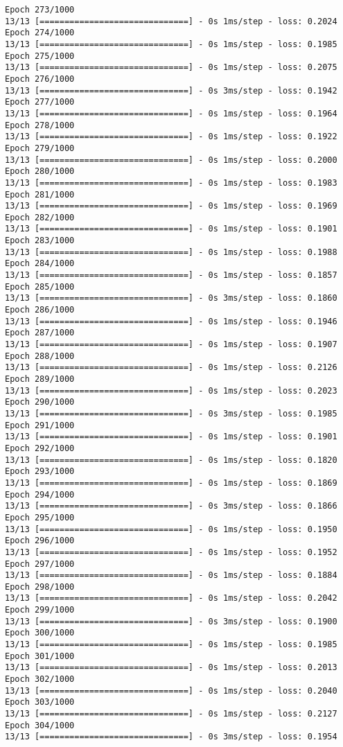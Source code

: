 \documentclass[11pt]{article}
\begin{document}
\begin{Verbatim}[commandchars=\\\{\}]
Epoch 273/1000
13/13 [==============================] - 0s 1ms/step - loss: 0.2024
Epoch 274/1000
13/13 [==============================] - 0s 1ms/step - loss: 0.1985
Epoch 275/1000
13/13 [==============================] - 0s 1ms/step - loss: 0.2075
Epoch 276/1000
13/13 [==============================] - 0s 3ms/step - loss: 0.1942
Epoch 277/1000
13/13 [==============================] - 0s 1ms/step - loss: 0.1964
Epoch 278/1000
13/13 [==============================] - 0s 1ms/step - loss: 0.1922
Epoch 279/1000
13/13 [==============================] - 0s 1ms/step - loss: 0.2000
Epoch 280/1000
13/13 [==============================] - 0s 1ms/step - loss: 0.1983
Epoch 281/1000
13/13 [==============================] - 0s 1ms/step - loss: 0.1969
Epoch 282/1000
13/13 [==============================] - 0s 1ms/step - loss: 0.1901
Epoch 283/1000
13/13 [==============================] - 0s 1ms/step - loss: 0.1988
Epoch 284/1000
13/13 [==============================] - 0s 1ms/step - loss: 0.1857
Epoch 285/1000
13/13 [==============================] - 0s 3ms/step - loss: 0.1860
Epoch 286/1000
13/13 [==============================] - 0s 1ms/step - loss: 0.1946
Epoch 287/1000
13/13 [==============================] - 0s 1ms/step - loss: 0.1907
Epoch 288/1000
13/13 [==============================] - 0s 1ms/step - loss: 0.2126
Epoch 289/1000
13/13 [==============================] - 0s 1ms/step - loss: 0.2023
Epoch 290/1000
13/13 [==============================] - 0s 3ms/step - loss: 0.1985
Epoch 291/1000
13/13 [==============================] - 0s 1ms/step - loss: 0.1901
Epoch 292/1000
13/13 [==============================] - 0s 1ms/step - loss: 0.1820
Epoch 293/1000
13/13 [==============================] - 0s 1ms/step - loss: 0.1869
Epoch 294/1000
13/13 [==============================] - 0s 3ms/step - loss: 0.1866
Epoch 295/1000
13/13 [==============================] - 0s 1ms/step - loss: 0.1950
Epoch 296/1000
13/13 [==============================] - 0s 1ms/step - loss: 0.1952
Epoch 297/1000
13/13 [==============================] - 0s 1ms/step - loss: 0.1884
Epoch 298/1000
13/13 [==============================] - 0s 1ms/step - loss: 0.2042
Epoch 299/1000
13/13 [==============================] - 0s 3ms/step - loss: 0.1900
Epoch 300/1000
13/13 [==============================] - 0s 1ms/step - loss: 0.1985
Epoch 301/1000
13/13 [==============================] - 0s 1ms/step - loss: 0.2013
Epoch 302/1000
13/13 [==============================] - 0s 1ms/step - loss: 0.2040
Epoch 303/1000
13/13 [==============================] - 0s 1ms/step - loss: 0.2127
Epoch 304/1000
13/13 [==============================] - 0s 3ms/step - loss: 0.1954

\end{Verbatim}
\end{document}
